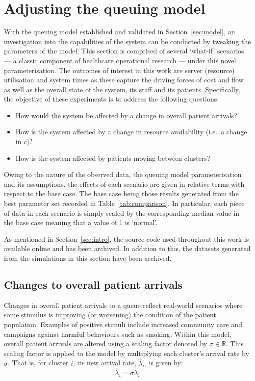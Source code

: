 \section{Adjusting the queuing model}\label{sec:scenarios}

With the queuing model established and validated in Section~\ref{sec:model}, an
investigation into the capabilities of the system can be conducted by tweaking
the parameters of the model. This section is comprised of several `what-if'
scenarios --- a classic component of healthcare operational research --- under
this novel parameterisation. The outcomes of interest in this work are server
(resource) utilisation and system times as these capture the driving forces of
cost and flow as well as the overall state of the system, its staff and its
patients.  Specifically, the objective of these experiments is to address the
following questions:
\begin{itemize}
    \item How would the system be affected by a change in overall patient
        arrivals?
    \item How is the system affected by a change in resource availability (i.e.\
        a change in \(c\))?
    \item How is the system affected by patients moving between clusters?
\end{itemize}

Owing to the nature of the observed data, the queuing model parameterisation
and its assumptions, the effects of each scenario are given in relative terms
with respect to the base case. The base case being those results generated from
the best parameter set recorded in Table~\ref{tab:comparison}. In particular,
each piece of data in each scenario is simply scaled by the corresponding median
value in the base case meaning that a value of 1 is `normal'.

As mentioned in Section~\ref{sec:intro}, the source code used throughout this
work is available online and has been archived. %
In addition to this, the datasets generated from the simulations in this section
have been archived. %


\subsection{Changes to overall patient arrivals}\label{subsec:arrivals}

Changes in overall patient arrivals to a queue reflect real-world scenarios
where some stimulus is improving (or worsening) the condition of the patient
population. Examples of positive stimuli include increased community care and
campaigns against harmful behaviours such as smoking. Within this model, overall
patient arrivals are altered using a scaling factor denoted by
\(\sigma\in\mathbb{R}\). This scaling factor is applied to the model by
multiplying each cluster's arrival rate by \(\sigma\). That is, for cluster
\(i\), its new arrival rate, \(\hat\lambda_i\), is given by:
\begin{equation}\label{eq:lambda}
    \hat\lambda_{i} = \sigma\lambda_i
\end{equation}


